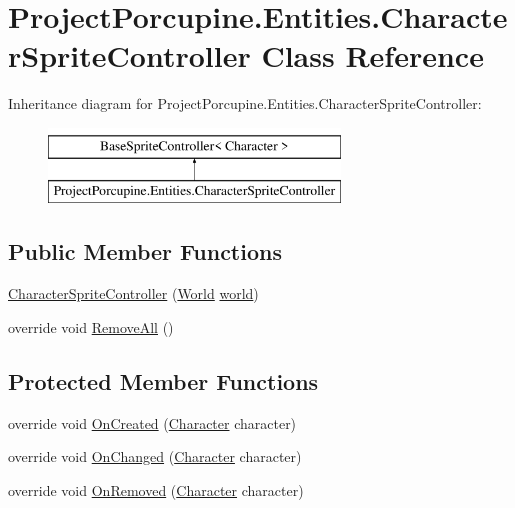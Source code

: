 \hypertarget{class_project_porcupine_1_1_entities_1_1_character_sprite_controller}{}\section{Project\+Porcupine.\+Entities.\+Character\+Sprite\+Controller Class Reference}
\label{class_project_porcupine_1_1_entities_1_1_character_sprite_controller}
Inheritance diagram for Project\+Porcupine.\+Entities.\+Character\+Sprite\+Controller\+:\begin{figure}[H]
\begin{center}
\leavevmode
\includegraphics[height=2.000000cm]{class_project_porcupine_1_1_entities_1_1_character_sprite_controller}
\end{center}
\end{figure}
\subsection*{Public Member Functions}
\begin{DoxyCompactItemize}
\item 
\hyperlink{class_project_porcupine_1_1_entities_1_1_character_sprite_controller_accaf15f72cf9f7c217a1ffef27ad8a22}{Character\+Sprite\+Controller} (\hyperlink{class_world}{World} \hyperlink{class_base_sprite_controller_a593ea6a31165eff51a0acffc12ea65ca}{world})
\item 
override void \hyperlink{class_project_porcupine_1_1_entities_1_1_character_sprite_controller_acb355f0f1482b7ad05ab8cfe69b92974}{Remove\+All} ()
\end{DoxyCompactItemize}
\subsection*{Protected Member Functions}
\begin{DoxyCompactItemize}
\item 
override void \hyperlink{class_project_porcupine_1_1_entities_1_1_character_sprite_controller_a94cd45156310fe30a007e42e66300473}{On\+Created} (\hyperlink{class_project_porcupine_1_1_entities_1_1_character}{Character} character)
\item 
override void \hyperlink{class_project_porcupine_1_1_entities_1_1_character_sprite_controller_abc1efe4b26e011babcc734289714617d}{On\+Changed} (\hyperlink{class_project_porcupine_1_1_entities_1_1_character}{Character} character)
\item 
override void \hyperlink{class_project_porcupine_1_1_entities_1_1_character_sprite_controller_a9a61679f9fa0a5273de1ca13f74eaaa6}{On\+Removed} (\hyperlink{class_project_porcupine_1_1_entities_1_1_character}{Character} character)
\end{DoxyCompactItemize}
